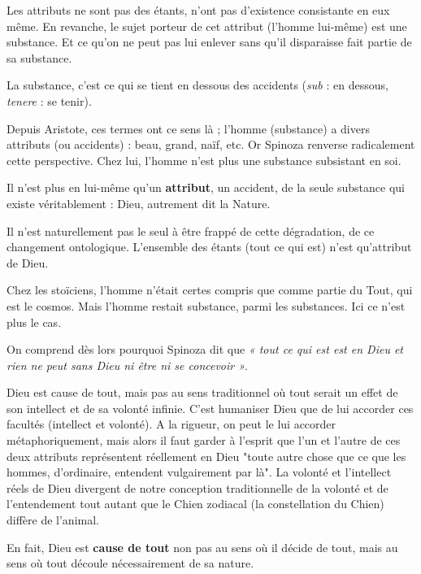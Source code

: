 \vspace{0.5cm}
Les attributs ne sont pas des étants, n’ont pas d’existence consistante en eux
même. En revanche, le sujet porteur de cet attribut (l’homme lui-même) est une
substance. Et ce qu’on ne peut pas lui enlever sans qu’il disparaisse fait
partie de sa substance.

\vspace{0.5cm}
La substance, c’est ce qui se tient en dessous des accidents ({\it sub} : en
dessous, {\it tenere} : se tenir).

Depuis Aristote, ces termes ont ce sens là ; l’homme (substance) a divers
attributs (ou accidents) : beau, grand, naïf, etc. Or Spinoza renverse
radicalement cette perspective. Chez lui, l’homme n’est plus une substance
subsistant en soi.

\vspace{0.5cm}
Il n’est plus en lui-même qu’un {\bf attribut}, un accident, de la seule substance
qui existe véritablement : Dieu, autrement dit la Nature.

Il n’est naturellement pas le seul à être frappé de cette dégradation, de ce
changement ontologique. L’ensemble des étants (tout ce qui est) n’est
qu’attribut de Dieu.

Chez les stoïciens, l’homme n’était certes compris que comme partie du Tout,
qui est le cosmos. Mais l’homme restait substance, parmi les substances.
Ici ce n’est plus le cas.

\vspace{0.5cm}
On comprend dès lors pourquoi Spinoza dit que {\it « tout ce qui est est en Dieu
et rien ne peut sans Dieu ni être ni se concevoir »}.

Dieu est cause de tout, mais pas au sens traditionnel où tout serait un effet
de son intellect et de sa volonté infinie. C’est humaniser Dieu que de lui
accorder ces facultés (intellect et volonté). A la rigueur, on peut le lui
accorder métaphoriquement, mais alors il faut garder à l’esprit que l’un et
l’autre de ces deux attributs représentent réellement en Dieu "toute autre
chose que ce que les hommes, d’ordinaire, entendent vulgairement par là".
La volonté et l’intellect réels de Dieu divergent de notre conception
traditionnelle de la volonté et de l’entendement tout autant que le Chien
zodiacal (la constellation du Chien) diffère de l’animal.

En fait, Dieu est {\bf cause de tout} non pas au sens où il décide de tout, mais au
sens où tout découle nécessairement de sa nature.

